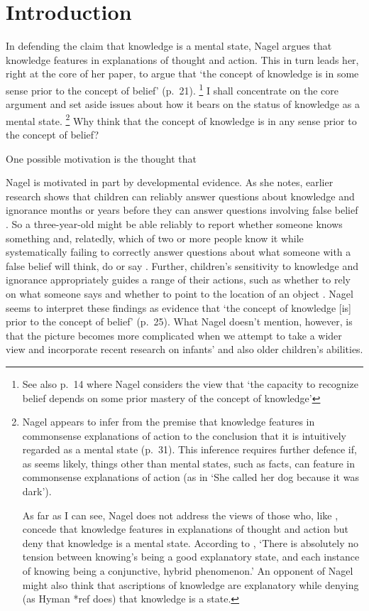 \documentclass[11pt,a4paper]{extarticle}
\begin{document}
\section{Introduction}
In defending the claim that knowledge is a mental state, Nagel argues that knowledge features in explanations of thought and action.
This in turn leads her, right at the core of her paper, to argue that  `the concept of knowledge is in some sense prior to the concept of belief' (p.\ 21).%
\footnote{
See also p.\ 14 where Nagel considers the view that `the capacity to recognize belief depends on some prior mastery of the concept of knowledge'
}
I shall concentrate on the core argument and set aside issues about how it bears on the status of knowledge as a mental state.%
\footnote{
Nagel appears to infer from the premise that knowledge features in commonsense explanations of action to the conclusion that it  is intuitively regarded as a mental state (p.\ 31).
This inference requires further defence if, as seems likely, things other than mental states, such as facts, can feature in commonsense explanations of action (as in `She called her dog because it was dark').

As far as I can see, Nagel does not address the views of those who, like \citet{fricker_2009}, concede that knowledge features in explanations of thought and action but deny that knowledge is a mental state.
According to \citet[p.\ 51]{fricker_2009}, `There is absolutely no tension between knowing's being a good explanatory state, and each instance of knowing being a conjunctive, hybrid phenomenon.'
An opponent of Nagel might also think that ascriptions of knowledge are explanatory while denying (as Hyman *ref does) that knowledge is a state.
}
Why think that the concept of knowledge is in any sense prior to the concept of belief?

One possible motivation is the thought that 







Nagel is motivated in part by developmental evidence.
As she notes, earlier research shows that
children can reliably answer questions about knowledge and ignorance months or years before they can answer questions involving false belief \citep{hogrefe_ignorance_1986}.
So a three-year-old might be able reliably to report whether someone knows something and, relatedly, which of two or more people know it while systematically failing to correctly answer questions about what someone with a false belief will think, do or say \citep{Wellman:2001lz}.
Further, children's sensitivity to knowledge and ignorance appropriately guides a range of their actions, such as whether to rely on what someone says \citep{Robinson:1999sq,Robinson:2003bh} and whether to point to the location of an object \citep{Dunham:2000tv,Liszkowski:2008al}.
Nagel seems to interpret these findings as evidence that `the concept of knowledge [is] prior to the concept of belief' (p.\ 25). 
What Nagel doesn't mention, however, is that the picture becomes more complicated when we attempt to take a wider view and incorporate  recent research on infants' and also older children's abilities.
\end{document}
